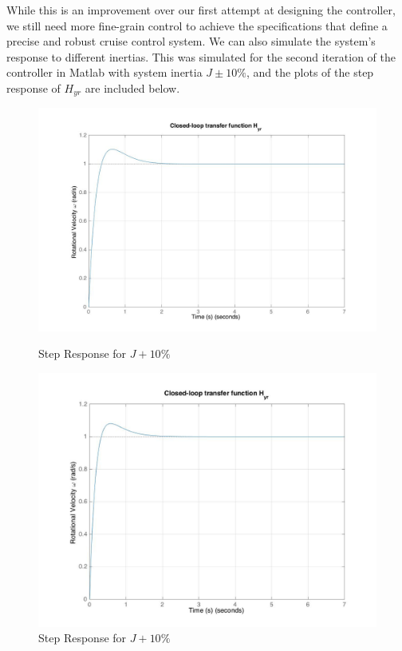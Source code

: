 \documentclass[11pt,titlepage]{article}
\begin{document}
	While this is an improvement over our first attempt at designing the controller, we still need more fine-grain control to achieve the specifications that define a precise and robust cruise control system. We can also simulate the system's response to different inertias. This was simulated for the second iteration of the controller in Matlab with system inertia $J\pm10\%$, and the plots of the step response of $H_{yr}$ are included below. 
	
	    \begin{figure}[H]
        \centering
        \begin{minipage}{.5\textwidth}
            \centering
            \includegraphics[scale=.18]{Hyr_stepPlus10_mat}
            \caption{Step Response for $J+10\%$}
            \label{fig:Hyr_stepPlus10_mat}
        \end{minipage}%
        \begin{minipage}{.5\textwidth}
            \centering
            \includegraphics[scale=.18]{Hyr_stepMinus10_mat}
            \caption{Step Response for $J+10\%$}
            \label{fig:Hyr_stepMinus10_mat}
        \end{minipage}%
    \end{figure}
	
\end{document}

